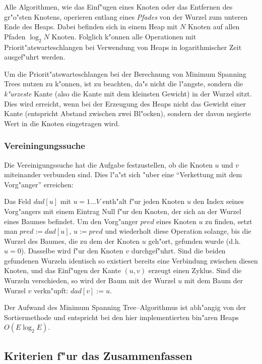 Alle Algorithmen, wie das Einf"ugen eines Knoten oder das Entfernen des gr"o"sten Knotens,
operieren entlang eines {\em Pfades\/} von der Wurzel zum unteren Ende des Heaps.
Dabei befinden sich in einem Heap mit $N$ Knoten auf allen Pfaden $\log_2 N$ Knoten.
Folglich k"onnen alle Operationen mit Priorit"atswarteschlangen bei Verwendung von Heaps in
logarithmischer Zeit ausgef"uhrt werden.

Um die Priorit"atswarteschlangen bei der Berechnung von Minimum Spanning Trees nutzen zu
k"onnen, ist zu beachten, da"s nicht die l"angste, sondern die {\em k"urzeste\/} Kante
(also die Kante mit dem kleinsten Gewicht) in der Wurzel sitzt.
Dies wird erreicht, wenn bei der Erzeugung des Heaps nicht das Gewicht
einer Kante (entspricht Abstand zwischen zwei Bl"ocken), sondern der davon negierte Wert
in die Knoten eingetragen wird.

\subsubsection{Vereiningungssuche}

Die Vereinigungssuche hat die Aufgabe festzustellen, ob die Knoten $u$ und $v$ miteinander
verbunden sind. Dies l"a"st sich "uber eine "`Verkettung mit dem Vorg"anger"' erreichen:

Das Feld $dad[u]$ mit $u=1\ldots V$ enth"alt f"ur jeden Knoten $u$ den Index seines Vorg"angers
mit einem Eintrag Null f"ur den Knoten, der sich an der Wurzel eines Baumes befindet. Um
den Vorg"anger $pred$ eines Knoten $u$ zu finden, setzt man $pred := dad[u]$, $u := pred$
und wiederholt diese Operation solange, bis die Wurzel des Baumes, die
zu dem der Knoten $u$ geh"ort, gefunden wurde (d.h.\ $u = 0$).
Dasselbe wird f"ur den Knoten $v$ durchgef"uhrt. Sind
die beiden gefundenen Wurzeln identisch so existiert bereits eine Verbindung
zwischen diesen Knoten, und das Einf"ugen der Kante $(u,v)$ erzeugt einen Zyklus.
Sind die Wurzeln verschieden, so wird der Baum mit der Wurzel $u$ mit dem Baum der Wurzel $v$
verkn"upft: $dad[v] := u$.

Der Aufwand des Minimum Spanning Tree--Algorithmus ist abh"angig von der Sortiermethode und
entspricht bei den hier implementierten bin"aren Heaps $O(E \log_2 E)$.

\subsection{Kriterien f"ur das Zusammenfassen}

